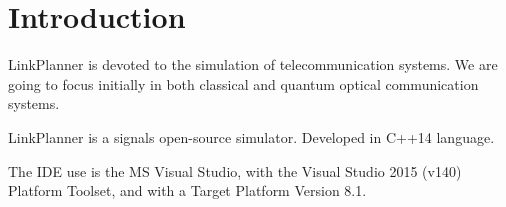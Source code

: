 
\chapter{Introduction}

LinkPlanner is devoted to the simulation of telecommunication systems.
We are going to focus initially in both classical and quantum optical communication systems.

LinkPlanner is a signals open-source simulator.
Developed in C++14 language.

The IDE use is the MS Visual Studio, with the Visual Studio 2015 (v140) Platform Toolset, and with a Target Platform Version 8.1.



